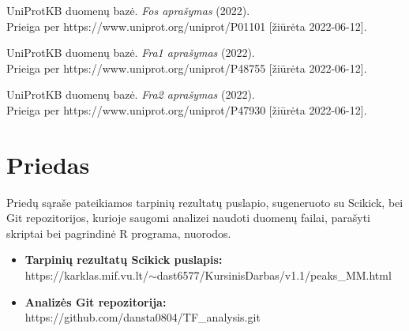 \documentclass[12pt]{article}
\begin{document}
\begin{thebibliography}{99}
 UniProtKB duomenų bazė. \emph{Fos aprašymas} (2022).\\
Prieiga per https://www.uniprot.org/uniprot/P01101 [žiūrėta 2022-06-12].

 UniProtKB duomenų bazė. \emph{Fra1 aprašymas} (2022).\\
Prieiga per https://www.uniprot.org/uniprot/P48755 [žiūrėta 2022-06-12].

 UniProtKB duomenų bazė. \emph{Fra2 aprašymas} (2022).\\
Prieiga per https://www.uniprot.org/uniprot/P47930 [žiūrėta 2022-06-12].

\end{thebibliography}

\newpage


\section{Priedas}

Priedų sąraše pateikiamos tarpinių rezultatų puslapio, sugeneruoto
su Scikick, bei Git repozitorijos, kurioje saugomi analizei naudoti
duomenų failai, parašyti skriptai bei pagrindinė R programa, nuorodos.

\begin{itemize}
    \item \textbf{Tarpinių rezultatų Scikick puslapis:}\\
        https://karklas.mif.vu.lt/\(\sim\)dast6577/KursinisDarbas/v1.1/peaks\_MM.html
    \item \textbf{Analizės Git repozitorija:}\\
        https://github.com/dansta0804/TF\_analysis.git
  \end{itemize}
\end{document}
